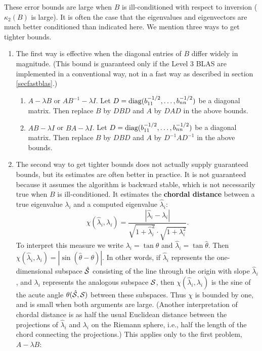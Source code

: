 These error bounds are large when $B$ is ill-conditioned with respect to
inversion ($\kappa_2 (B)$ is large). It is often the case that the eigenvalues
and eigenvectors are much better conditioned than indicated here.
We mention three ways to get tighter bounds.

\begin{enumerate}

\item The first way is effective when the diagonal entries of $B$ differ
widely in magnitude.
(This bound is guaranteed
only if the Level 3 BLAS are implemented in a conventional way,
not in a fast way as described in section \ref{secfastblas}.)

\begin{enumerate}

\item $A- \lambda B$ or $A B^{-1} - \lambda I$. 
Let $D = {\mbox {\rm diag}} (b_{11}^{-1/2} , \ldots , b_{nn}^{-1/2})$
be a diagonal matrix.
Then replace $B$ by $DBD$ and $A$ by $DAD$ in the above bounds.

\item $AB- \lambda I$ or $BA - \lambda I$.
Let $D = {\mbox {\rm diag}} (b_{11}^{-1/2} , \ldots , b_{nn}^{-1/2})$
be a diagonal matrix.
Then replace $B$ by $DBD$ and $A$ by $D^{-1}AD^{-1}$ in the above bounds.

\end{enumerate}

\item The second way to get tighter bounds does not actually supply guaranteed
bounds, but its estimates are often better in practice.
It is not guaranteed because it assumes the algorithm is backward stable,
which is not necessarily true when $B$ is ill-conditioned.
It estimates the {\bf chordal distance} between a
true eigenvalue $\lambda_i$ and a computed eigenvalue $\hat{\lambda}_i$:
\[
\chi ( \hat{\lambda}_i , \lambda_i ) =
\frac{| \hat{\lambda}_i - \lambda_i |}
{\sqrt{1 + \hat{\lambda}_i^2} \cdot \sqrt{1 +  \lambda_i^2} }
.\]
To interpret this measure we write $\lambda_i = \tan \theta$
and $\hat{\lambda}_i = \tan \hat{\theta}$. Then
$\chi ( \hat{\lambda}_i , \lambda_i ) = | \sin ( \hat{\theta} - \theta ) |$.
In other words, if $\hat{\lambda}_i$ represents the one-dimensional subspace
$\hat{\cal S}$ consisting of the line through the origin with slope $\hat{\lambda}_i$,
and $\lambda_i$ represents the analogous subspace $\cal S$, then
$\chi ( \hat{\lambda}_i , \lambda_i )$
is the sine of the acute angle $\theta ( \hat{\cal S} , {\cal S} )$ between these
subspaces.
Thus $\chi$ is bounded by one, and is small when both arguments are large.
(Another interpretation of chordal distance is as half the usual
Euclidean distance between the projections of $\hat{\lambda}_i$ and
$\lambda_i$ on the Riemann sphere, i.e., half the length of the chord
connecting the projections.)
This applies only to the first problem, $A - \lambda B$:


\end{enumerate}

